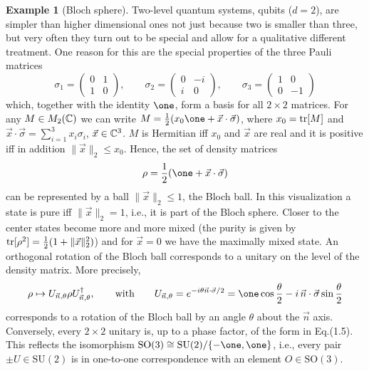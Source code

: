 \documentclass[11pt,a4paper]{article}
\theoremstyle{plain}
\theoremstyle{definition}
\newtheorem{example}{Example}[section]
\theoremstyle{remark}
\numberwithin{equation}{section}
\begin{document}
\begin{example}[Bloch sphere]
    Two-level quantum systems, qubits ($d=2$), are simpler than higher dimensional ones not just because two is smaller than three, but very often they turn out to be special and allow for a qualitative different treatment. One reason for this are the special properties of the three Pauli matrices
    \begin{equation}
        \sigma_1=
        \begin{pmatrix}
            0 &1\\
            1 &0
        \end{pmatrix},
        \qquad
        \sigma_2=
        \begin{pmatrix}
            0 &-i\\
            i &0
        \end{pmatrix},
        \qquad
        \sigma_3=
        \begin{pmatrix}
            1 &0\\
            0 &-1
        \end{pmatrix}
    \end{equation}
    which, together with the identity $\one$, form a basis for all $2\times 2$ matrices. For any $M\in M_2(\mathbb{C})$ we can write $M=\frac12(x_0\one+\vec{x}\cdot \vec{\sigma})$, where $x_0=\operatorname{tr}[M]$ and $\vec{x}\cdot \vec{\sigma}=\sum_{i=1}^3 x_i\sigma_i$, $\vec{x}\in \mathbb{C}^3$. $M$ is Hermitian iff $x_0$ and $\vec{x}$ are real and it is positive iff in addition $\|\vec{x}\|_2\le x_0$. Hence, the set of density matrices
    \begin{equation}
        \rho = \frac12(\one + \vec{x}\cdot \vec{\sigma})
    \end{equation}
    can be represented by a ball $\|\vec{x}\|_2\le 1$, the Bloch ball. In this visualization a state is pure iff $\|\vec{x}\|_2=1$, i.e., it is part of the Bloch sphere. Closer to the center states become more and more mixed (the purity is given by $\operatorname{tr}[\rho^2]=\frac12(1+\|\vec{x}\|_2^2)$) and for $\vec{x}=0$ we have the maximally mixed state. An orthogonal rotation of the Bloch ball corresponds to a unitary on the level of the density matrix. More precisely,
    \begin{equation}
        \rho \mapsto U_{\vec{n},\theta}\rho U_{\vec{n},\theta}^\dagger,
        \qquad \text{with}\qquad
        U_{\vec{n},\theta}
        = e^{-i\theta \vec{n}\cdot \vec{\sigma}/2}
        = \one \cos\frac{\theta}{2} - i\,\vec{n}\cdot \vec{\sigma} \sin\frac{\theta}{2}
    \end{equation}
    corresponds to a rotation of the Bloch ball by an angle $\theta$ about the $\vec{n}$ axis. Conversely, every $2\times 2$ unitary is, up to a phase factor, of the form in Eq.(1.5). This reflects the isomorphism $\mathrm{SO}(3)\cong \mathrm{SU}(2)/\{-\one,\one\}$, i.e., every pair $\pm U\in \mathrm{SU}(2)$ is in one-to-one correspondence with an element $O\in \mathrm{SO}(3)$.
\end{example}
\end{document}
